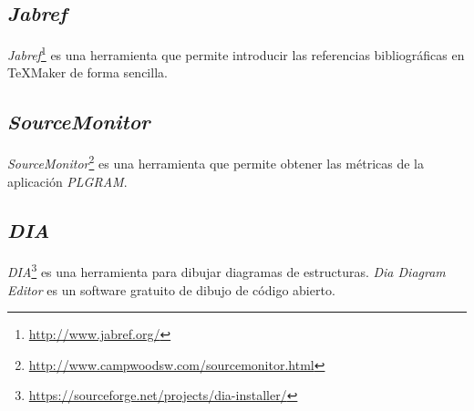 \subsection{\textit{Jabref}}
\textit{Jabref}\footnote{\url{http://www.jabref.org/}} es una herramienta que permite introducir las referencias bibliográficas en \TeX{}Maker de forma sencilla.

\subsection{\textit{SourceMonitor}}
\textit{SourceMonitor}\footnote{\url{http://www.campwoodsw.com/sourcemonitor.html}} es una herramienta que permite obtener las métricas de la aplicación \textit{PLGRAM}.

\subsection{\textit{DIA}}
\textit{DIA}\footnote{\url{https://sourceforge.net/projects/dia-installer/}} es una herramienta para dibujar diagramas de estructuras. \textit{Dia Diagram Editor} es un software gratuito de dibujo de código abierto.




